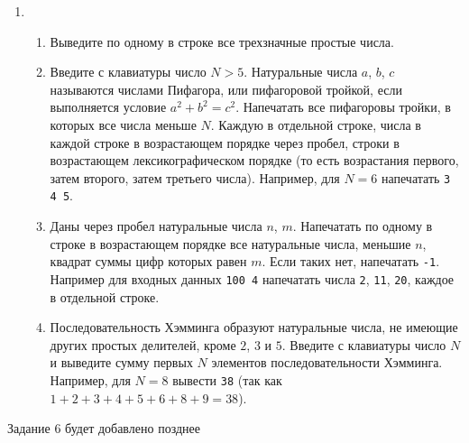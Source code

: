 \documentclass{article}
\begin{document}
\begin{enumerate}[label={}, leftmargin=0pt, itemindent=0pt]
\begin{enumerate}[label=\arabic{enumi}.\arabic*.]
\end{enumerate}
\hrulefill

\item
\begin{enumerate}[label=\arabic{enumi}.\arabic*.]
\item 
Выведите по одному в строке все трехзначные простые числа.
\item 
Введите с клавиатуры число $N>5$. Натуральные числа $a$, $b$, $c$ называются числами Пифагора, или пифагоровой тройкой, если выполняется условие $a^2+b^2=c^2$. Напечатать все пифагоровы тройки, в которых все числа меньше $N$. Каждую в отдельной строке, числа в каждой строке в возрастающем порядке через пробел, строки в возрастающем лексикографическом порядке
(то есть возрастания первого, затем второго, затем третьего числа). Например, для $N=6$ напечатать \texttt{3 4 5}.
\item 
Даны через пробел натуральные числа $n$, $m$. Напечатать по одному в строке в возрастающем порядке все натуральные числа, меньшие $n$, квадрат суммы цифр которых равен $m$.
Если таких нет, напечатать \texttt{-1}. Например для входных данных \texttt{100 4} напечатать числа \texttt{2}, \texttt{11}, \texttt{20}, каждое в отдельной строке.
\item
Последовательность Хэмминга образуют натуральные числа, не имеющие других простых делителей, кроме $2$, $3$ и $5$. Введите с клавиатуры число $N$ и выведите сумму первых $N$ элементов последовательности Хэмминга. Например, для $N=8$ вывести \texttt{38} (так как $1+2+3+4+5+6+8+9=38$).
\end{enumerate}

\end{enumerate}

\hrulefill

Задание 6 будет добавлено позднее
\end{document}
